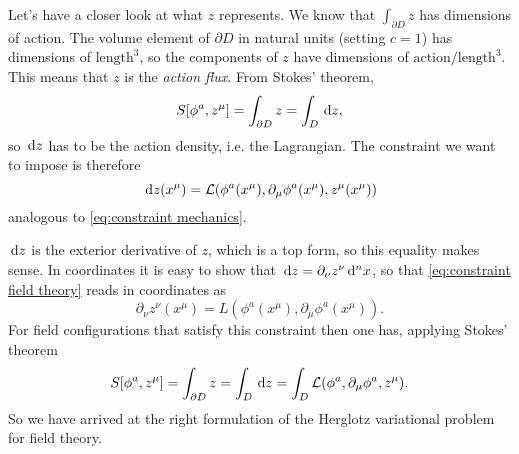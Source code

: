 \documentclass[../main.tex]{subfiles}
\begin{document}
Let's have a closer look at what \( z \) represents. We know that \( \int_{\partial D} z
\) has dimensions of action. The volume element of \( \partial D \) in natural units
(setting \( c = 1\)) has dimensions of \( \text{length}^3 \), so the components of \( z \)
have dimensions of \( \text{action}/\text{length}^3 \). This means that \( z \) is the
\emph{action flux}. From Stokes' theorem,
\begin{equation*}
	S[\phi^a, z^\mu] = \int_{\partial D} z = \int_D \,\mathrm{d} z,
\end{equation*}
so \( \,\mathrm{d} z \) has to be the action density, i.e. the Lagrangian. The constraint we want
to impose is therefore 
\begin{equation} \label{eq:constraint field theory}
	\,\mathrm{d} z(x^\mu) = \mathcal{L}(\phi^a(x^\mu), \partial_\mu \phi^a(x^\mu), z^\mu(x^\mu))
\end{equation}
analogous to \cref{eq:constraint mechanics}. 

\( \,\mathrm{d} z \) is the exterior derivative of \( z \), which is a top form, so this equality
makes sense. In coordinates it is easy to show that \( \,\mathrm{d} z = \partial_\nu z^\nu \,\mathrm{d}^n x
\), so that \cref{eq:constraint field theory} reads in coordinates as
\begin{equation} \label{eq:constraint field theory coordinates}
	\partial_\nu z^\nu (x^\mu) = L(\phi^a(x^\mu), \partial_\mu \phi^a(x^\mu)).
\end{equation}
For field configurations that satisfy this constraint then one has, applying Stokes'
theorem
\begin{equation*}
	S[\phi^a, z^\mu] = \int_{\partial D} z = \int_D \,\mathrm{d} z = \int_D \mathcal{L}(\phi^a, \partial_\mu
	\phi^a, z^\mu). 
\end{equation*}
So we have arrived at the right formulation of the Herglotz variational problem for field
theory.
\end{document}

